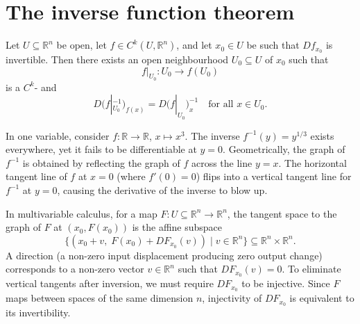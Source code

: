 
\section{The inverse function theorem}
\label{sec:inverse_function_theorem}

\begin{theorem}
\label{thm:inverse_function_theorem}
Let $U \subseteq \mathbb{R}^n$ be open, let $f \in C^k(U,\mathbb{R}^n)$, and let $x_0 \in U$ be
such that $Df_{x_0}$ is invertible. Then there exists an open neighbourhood $U_0 \subseteq U$ of
$x_0$ such that
\[f|_{U_0} : U_0 \to f(U_0)\]
is a $C^k$-  and
\[D\big(f|_{U_0}^{-1}\big)_{f(x)} = D\big(f|_{U_0}\big)_x^{-1} \quad \text{for all } x \in U_0.\]
\end{theorem}

\begin{remark}
\label{rem:inverse_function_theorem_intuition}
In one variable, consider $f : \mathbb{R} \to \mathbb{R}$, $x \mapsto x^3$. The inverse $f^{-1}(y) = y^{1/3}$ exists everywhere, yet it fails to be differentiable at $y = 0$. Geometrically, the graph of $f^{-1}$ is obtained by reflecting the graph of $f$ across the line $y = x$. The horizontal tangent line of $f$ at $x = 0$ (where $f'(0) = 0$) flips into a vertical tangent line for $f^{-1}$ at $y = 0$, causing the derivative of the inverse to blow up.

In multivariable calculus, for a map $F : U \subseteq \mathbb{R}^n \to \mathbb{R}^n$, the tangent space to the graph of $F$ at $(x_0, F(x_0))$ is the affine subspace
\[
\big\{(x_0 + v, \; F(x_0) + DF_{x_0}(v)) \mid v \in \mathbb{R}^n\big\} \subseteq \mathbb{R}^n \times \mathbb{R}^n.
\]
A  direction (a non-zero input displacement producing zero output change) corresponds to a non-zero vector $v \in \mathbb{R}^n$ such that $DF_{x_0}(v) = 0$. To eliminate vertical tangents after inversion, we must require $DF_{x_0}$ to be injective. Since $F$ maps between spaces of the same dimension $n$, injectivity of $DF_{x_0}$ is equivalent to its invertibility.
\end{remark}

